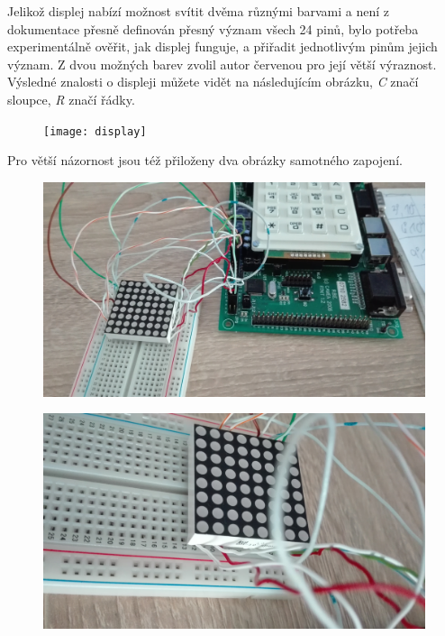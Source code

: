 \documentclass[12pt,a4paper,titlepage]{article}
\begin{document}
Jelikož displej nabízí možnost svítit dvěma různými barvami a není z dokumentace přesně definován přesný význam všech 24  pinů, bylo potřeba experimentálně ověřit, jak displej funguje, a přiřadit jednotlivým pinům jejich význam. Z dvou možných barev zvolil autor červenou pro její větší výraznost. Výsledné znalosti o displeji můžete vidět na následujícím obrázku, \textit{C} značí sloupce, \textit{R} značí řádky.

\begin{figure}[h]
\centering
\texttt{[image: display]}
 \label{display}
\end{figure}



Pro větší názornost jsou též přiloženy dva obrázky samotného zapojení.

\begin{figure}[h]
\centering
\includegraphics[scale=0.2]{fitkit_resized}
 \label{foto}
\end{figure}

\begin{figure}[h]
\centering
\includegraphics[scale=0.2]{fitkit2_resized}
 \label{foto2}
\end{figure}
\end{document}
